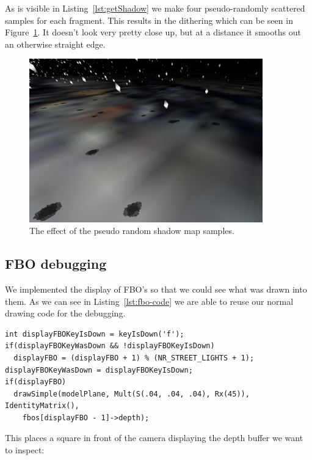 \documentclass[a4paper,12pt]{article}
\begin{document}
As is visible in Listing~\ref{lst:getShadow} we make four pseudo-randomly scattered samples for each fragment. This results in the dithering which can be seen in Figure~\ref{fig:dithering}. It doesn't look very pretty close up, but at a distance it smooths out an otherwise straight edge.

\begin{figure}[h]
  \centering
  \includegraphics[width=0.9\textwidth]{dithering}
  \caption{\label{fig:dithering} The effect of the pseudo random shadow map samples.}
\end{figure}

\subsection{FBO debugging}

We implemented the display of FBO's so that we could see what was drawn into them. As we can see in Listing~\ref{lst:fbo-code} we are able to reuse our normal drawing code for the debugging.

\begin{lstlisting}[label=lst:fbo-code,caption= Switching between the FBO's]
int displayFBOKeyIsDown = keyIsDown('f');
if(displayFBOKeyWasDown && !displayFBOKeyIsDown)
  displayFBO = (displayFBO + 1) % (NR_STREET_LIGHTS + 1);
displayFBOKeyWasDown = displayFBOKeyIsDown;
if(displayFBO)
  drawSimple(modelPlane, Mult(S(.04, .04, .04), Rx(45)), IdentityMatrix(),
    fbos[displayFBO - 1]->depth);
\end{lstlisting}

This places a square in front of the camera displaying the depth buffer we want to inspect:
\end{document}
